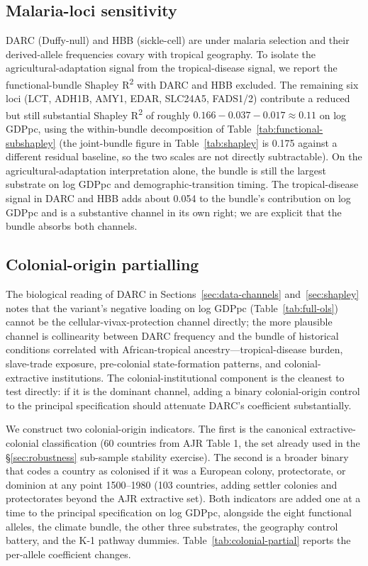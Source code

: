 \documentclass[11pt,letterpaper]{article}
\begin{document}
\subsection{Malaria-loci sensitivity}
\label{sec:malaria-sensitivity}

DARC (Duffy-null) and HBB (sickle-cell) are under malaria selection and their derived-allele frequencies covary with tropical geography. To isolate the agricultural-adaptation signal from the tropical-disease signal, we report the functional-bundle Shapley R\textsuperscript{2} with DARC and HBB excluded. The remaining six loci (LCT, ADH1B, AMY1, EDAR, SLC24A5, FADS1/2) contribute a reduced but still substantial Shapley R\textsuperscript{2} of roughly $0.166 - 0.037 - 0.017 \approx 0.11$ on log GDPpc, using the within-bundle decomposition of Table~\ref{tab:functional-subshapley} (the joint-bundle figure in Table~\ref{tab:shapley} is 0.175 against a different residual baseline, so the two scales are not directly subtractable). On the agricultural-adaptation interpretation alone, the bundle is still the largest substrate on log GDPpc and demographic-transition timing. The tropical-disease signal in DARC and HBB adds about 0.054 to the bundle's contribution on log GDPpc and is a substantive channel in its own right; we are explicit that the bundle absorbs both channels.

\subsection{Colonial-origin partialling}
\label{sec:colonial-partial}

The biological reading of DARC in Sections~\ref{sec:data-channels} and~\ref{sec:shapley} notes that the variant's negative loading on log GDPpc (Table~\ref{tab:full-ols}) cannot be the cellular-vivax-protection channel directly; the more plausible channel is collinearity between DARC frequency and the bundle of historical conditions correlated with African-tropical ancestry---tropical-disease burden, slave-trade exposure, pre-colonial state-formation patterns, and colonial-extractive institutions. The colonial-institutional component is the cleanest to test directly: if it is the dominant channel, adding a binary colonial-origin control to the principal specification should attenuate DARC's coefficient substantially.

We construct two colonial-origin indicators. The first is the canonical \citet{acemoglu2001} extractive-colonial classification (60 countries from AJR Table 1, the set already used in the §\ref{sec:robustness} sub-sample stability exercise). The second is a broader binary that codes a country as colonised if it was a European colony, protectorate, or dominion at any point 1500--1980 (103 countries, adding settler colonies and protectorates beyond the AJR extractive set). Both indicators are added one at a time to the principal specification on log GDPpc, alongside the eight functional alleles, the climate bundle, the other three substrates, the geography control battery, and the K-1 pathway dummies. Table~\ref{tab:colonial-partial} reports the per-allele coefficient changes.
\end{document}
